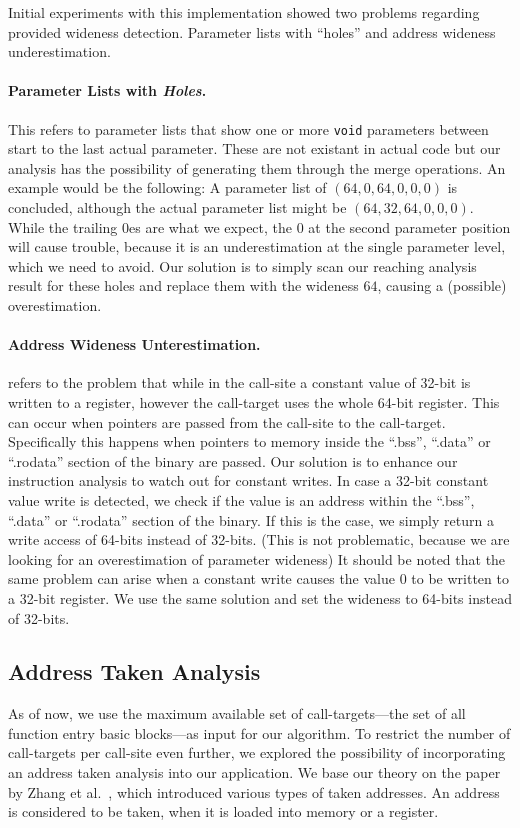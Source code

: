 Initial experiments with this implementation showed two problems regarding provided wideness detection.  Parameter lists with ``holes'' and address wideness underestimation.

\paragraph{Parameter Lists with \textit{Holes}.} This refers to parameter lists that show one or more \texttt{void} parameters between start to the last actual parameter. 
These are not existant in actual code but our analysis has the possibility of generating them through the merge operations. An example would be the following: 
A parameter list of $(64, 0, 64, 0, 0, 0)$ is concluded, although the actual parameter list might be $(64, 32, 64, 0, 0, 0)$. While the trailing 0es are 
what we expect, the 0 at the second parameter position will cause trouble, because it is an underestimation at the single parameter level, which we need to avoid.
Our solution is to simply scan our reaching analysis result for these holes and replace them with the wideness $64$, causing a (possible) overestimation.

\paragraph{Address Wideness Unterestimation.} refers to the problem that while in the call-site a constant value of 32-bit is written to a register, however 
the call-target uses the whole 64-bit register. This can occur when pointers are passed from the call-site to the call-target. Specifically this happens 
when pointers to memory inside the ``.bss'', ``.data'' or ``.rodata'' section of the binary are passed.
Our solution is to enhance our instruction analysis to watch out for constant writes. In case a 32-bit constant value write is detected, we check if the
value is an address within the ``.bss'', ``.data'' or ``.rodata'' section of the binary. If this is the case, we simply return a write access of 64-bits 
instead of 32-bits. (This is not problematic, because we are looking for an overestimation of parameter wideness)
It should be noted that the same problem can arise when a constant write causes the value 0 to be written to a 32-bit register. We use the same solution
and set the wideness to 64-bits instead of 32-bits.

\subsection{Address Taken Analysis}
\label{section:addresstakenanalysis}
As of now, we use the maximum available set of call-targets---the set of all function entry basic blocks---as input for our algorithm. 
To restrict the number of call-targets per call-site even further, we explored the possibility of incorporating an address taken analysis
into our application. We base our theory on the paper by Zhang et al.~\cite{mingwei:sekar}, which introduced various types of taken
addresses. An address is considered to be taken, when it is loaded into memory or a register.

